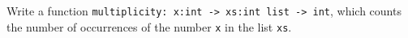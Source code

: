 Write a function \lstinline{multiplicity: x:int -> xs:int list -> int}, which counts the number of occurrences of the number \lstinline{x} in the list \lstinline{xs}.
